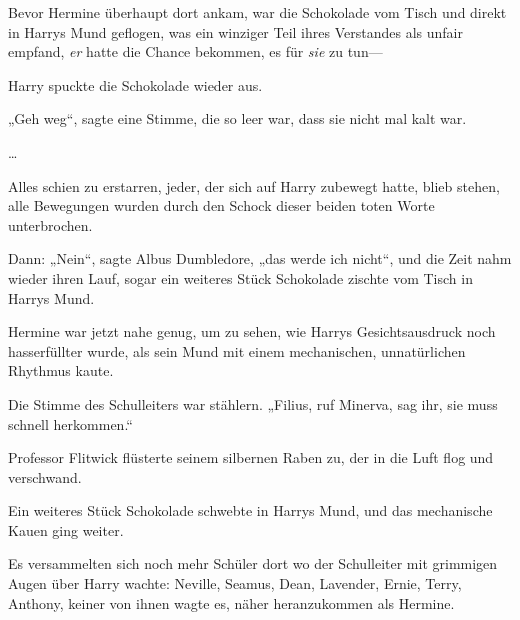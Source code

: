 Bevor Hermine überhaupt dort ankam, war die Schokolade vom Tisch und direkt in Harrys Mund geflogen, was ein winziger Teil ihres Verstandes als unfair empfand, \emph{er} hatte die Chance bekommen, es für \emph{sie} zu tun—

Harry spuckte die Schokolade wieder aus.

„Geh weg“, sagte eine Stimme, die so leer war, dass sie nicht mal kalt war.

…

Alles schien zu erstarren, jeder, der sich auf Harry zubewegt hatte, blieb stehen, alle Bewegungen wurden durch den Schock dieser beiden toten Worte unterbrochen.

Dann: „Nein“, sagte Albus Dumbledore, „das werde ich nicht“, und die Zeit nahm wieder ihren Lauf, sogar ein weiteres Stück Schokolade zischte vom Tisch in Harrys Mund.

Hermine war jetzt nahe genug, um zu sehen, wie Harrys Gesichtsausdruck noch hasserfüllter wurde, als sein Mund mit einem mechanischen, unnatürlichen Rhythmus kaute.

Die Stimme des Schulleiters war stählern. „Filius, ruf Minerva, sag ihr, sie muss schnell herkommen.“

Professor Flitwick flüsterte seinem silbernen Raben zu, der in die Luft flog und verschwand.

Ein weiteres Stück Schokolade schwebte in Harrys Mund, und das mechanische Kauen ging weiter.

Es versammelten sich noch mehr Schüler dort wo der Schulleiter mit grimmigen Augen über Harry wachte: Neville, Seamus, Dean, Lavender, Ernie, Terry, Anthony, keiner von ihnen wagte es, näher heranzukommen als Hermine.

